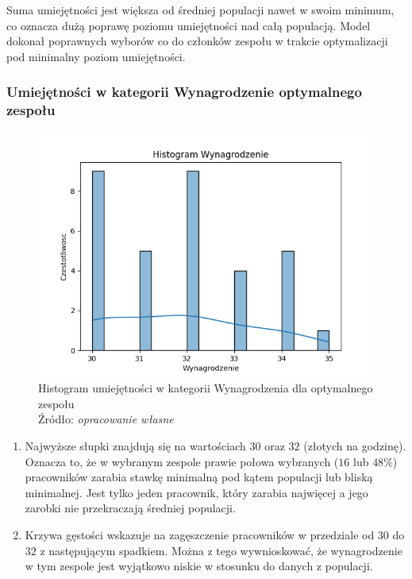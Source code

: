         \par Suma umiejętności jest większa od średniej populacji nawet w swoim minimum, co oznacza dużą poprawę poziomu umiejętności nad całą populacją. Model dokonał poprawnych wyborów co do członków zespołu w trakcie optymalizacji pod minimalny poziom umiejętności.

        \subsubsection{Umiejętności w kategorii Wynagrodzenie optymalnego zespołu}
        \begin{figure}[H]
            \centering
            \includegraphics[width=\linewidth]{chapters/Images/hist_wynagrodzenie_optimal.png}
            \cprotect\caption{Histogram umiejętności w kategorii Wynagrodzenia dla optymalnego zespołu\\ Źródło:\textit{ opracowanie własne}}
            \label{fig:hist_wynagrodzenie_optimal}
        \end{figure}

        \begin{enumerate}
            \item Najwyższe słupki znajdują się na wartościach $30$ oraz $32$ (złotych na godzinę). Oznacza to, że w wybranym zespole prawie połowa wybranych ($16$ lub $48\%$) pracowników zarabia stawkę minimalną pod kątem populacji lub bliską minimalnej. Jest tylko jeden pracownik, który zarabia najwięcej a jego zarobki nie przekraczają średniej populacji.
            \item Krzywa gęstości wskazuje na zagęszczenie pracowników w przedziale od $30$ do $32$ z następującym spadkiem. Można z tego wywnioskować, że wynagrodzenie w tym zespole jest wyjątkowo niskie w stosunku do danych z populacji.
        \end{enumerate}
        
